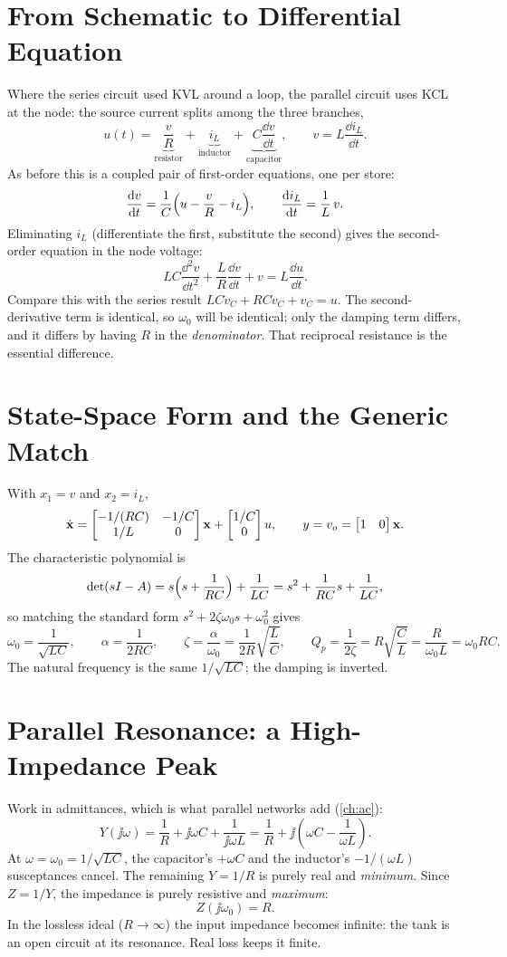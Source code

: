 \section{From Schematic to Differential Equation}
Where the series circuit used KVL around a loop, the parallel circuit uses KCL at
the node: the source current splits among the three branches,
\[
u(t)=\underbrace{\frac{v}{R}}_{\text{resistor}}
+\underbrace{i_L}_{\text{inductor}}
+\underbrace{C\frac{\dd v}{\dd t}}_{\text{capacitor}},
\qquad
v=L\frac{\dd i_L}{\dd t}.
\]
As before this is a coupled pair of first-order equations, one per store:
\[
\frac{\mathrm{d} v}{\mathrm{d} t}=\frac{1}{C}\Bigl(u-\frac{v}{R}-i_L\Bigr),
\qquad
\frac{\mathrm{d} i_L}{\mathrm{d} t}=\frac{1}{L}\,v .
\]
Eliminating \(i_L\) (differentiate the first, substitute the second) gives the
second-order equation in the node voltage:
\[
\boxed{\,LC\frac{\dd^2 v}{\dd t^2}+\frac{L}{R}\frac{\dd v}{\dd t}+v
=L\frac{\dd u}{\dd t}.\,}
\]
Compare this with the series result \(LC\ddot v_C+RC\dot v_C+v_C=u\). The
second-derivative term is identical, so \(\omega_0\) will be identical; only the
damping term differs, and it differs by having \(R\) in the \emph{denominator}.
That reciprocal resistance is the essential difference.

\section{State-Space Form and the Generic Match}
With \(x_1=v\) and \(x_2=i_L\),
\[
\dot{\mathbf{x}}=
\begin{bmatrix}-1/(RC) & -1/C\\ 1/L & 0\end{bmatrix}\mathbf{x}
+\begin{bmatrix}1/C\\ 0\end{bmatrix}u,
\qquad
y=v_o=\begin{bmatrix}1 & 0\end{bmatrix}\mathbf{x} .
\]
The characteristic polynomial is
\[
\det(sI-A)=s\Bigl(s+\frac{1}{RC}\Bigr)+\frac{1}{LC}
=s^2+\frac{1}{RC}s+\frac{1}{LC},
\]
so matching the standard form \(s^2+2\zeta\omega_0 s+\omega_0^2\) gives
\[
\omega_0=\frac{1}{\sqrt{LC}},
\qquad
\alpha=\frac{1}{2RC},
\qquad
\zeta=\frac{\alpha}{\omega_0}=\frac{1}{2R}\sqrt{\frac{L}{C}},
\qquad
Q_p=\frac{1}{2\zeta}=R\sqrt{\frac{C}{L}}=\frac{R}{\omega_0 L}=\omega_0 RC .
\]
The natural frequency is the same \(1/\sqrt{LC}\); the damping is inverted.

\section{Parallel Resonance: a High-Impedance Peak}
Work in admittances, which is what parallel networks add (\cref{ch:ac}):
\[
Y(\jj\omega)=\frac{1}{R}+\jj\omega C+\frac{1}{\jj\omega L}
=\frac{1}{R}+\jj\left(\omega C-\frac{1}{\omega L}\right).
\]
At \(\omega=\omega_0=1/\sqrt{LC}\), the capacitor's \(+\omega C\) and the
inductor's \(-1/(\omega L)\) susceptances cancel. The remaining \(Y=1/R\) is purely
real and \emph{minimum}. Since \(Z=1/Y\), the impedance is purely resistive and
\emph{maximum}:
\[
Z(\jj\omega_0)=R .
\]
In the lossless ideal (\(R\to\infty\)) the input impedance becomes infinite: the
tank is an open circuit at its resonance. Real loss keeps it finite.

